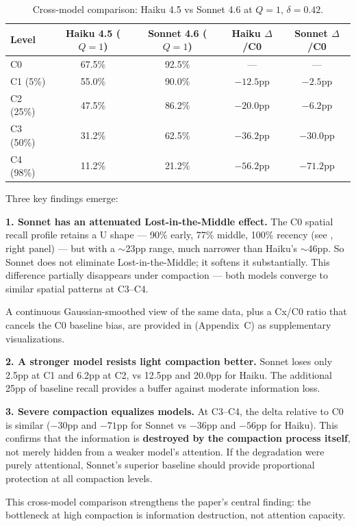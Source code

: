 \begin{table}[h]
\centering
\caption{Cross-model comparison: Haiku 4.5 vs Sonnet 4.6 at $Q=1$, $\delta=0.42$.}
\label{tab:sonnet}
\begin{tabular}{lcccc}
\toprule
Level & Haiku 4.5 ($Q=1$) & Sonnet 4.6 ($Q=1$) & Haiku $\Delta$/C0 & Sonnet $\Delta$/C0 \\
\midrule
C0       & 67.5\% & 92.5\% & ---       & --- \\
C1 (5\%) & 55.0\% & 90.0\% & $-12.5$pp & $-2.5$pp \\
C2 (25\%)& 47.5\% & 86.2\% & $-20.0$pp & $-6.2$pp \\
C3 (50\%)& 31.2\% & 62.5\% & $-36.2$pp & $-30.0$pp \\
C4 (98\%)& 11.2\% & 21.2\% & $-56.2$pp & $-71.2$pp \\
\bottomrule
\end{tabular}
\end{table}

Three key findings emerge:

\textbf{1. Sonnet has an attenuated Lost-in-the-Middle effect.} The C0 spatial
recall profile retains a U shape --- 90\% early, 77\% middle, 100\% recency
(see , right panel) --- but with a $\sim$23pp range,
much narrower than Haiku's $\sim$46pp. So Sonnet does not eliminate
Lost-in-the-Middle; it softens it substantially. This difference partially
disappears under compaction --- both models converge to similar spatial
patterns at C3--C4.

A continuous Gaussian-smoothed view of the same data, plus a Cx/C0 ratio
that cancels the C0 baseline bias, are provided in
 (Appendix~C) as supplementary visualizations.

\textbf{2. A stronger model resists light compaction better.} Sonnet loses only
2.5pp at C1 and 6.2pp at C2, vs 12.5pp and 20.0pp for Haiku. The additional
25pp of baseline recall provides a buffer against moderate information loss.

\textbf{3. Severe compaction equalizes models.} At C3--C4, the delta relative to C0
is similar ($-30$pp and $-71$pp for Sonnet vs $-36$pp and $-56$pp for Haiku). This
confirms that the information is \textbf{destroyed by the compaction process itself},
not merely hidden from a weaker model's attention. If the degradation were
purely attentional, Sonnet's superior baseline should provide proportional
protection at all compaction levels.

This cross-model comparison strengthens the paper's central finding: the
bottleneck at high compaction is information destruction, not attention
capacity.
